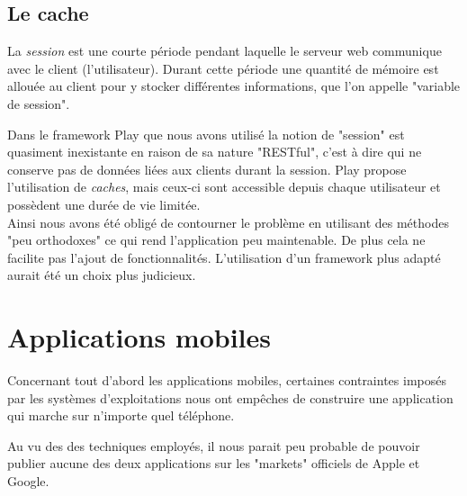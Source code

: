 \subsection{Le cache}

La \textit{session} est une courte période pendant laquelle le serveur web communique avec le client (l'utilisateur).
Durant cette période une quantité de mémoire est allouée au client pour y stocker différentes informations, que l'on appelle "variable de session".

Dans le framework Play que nous avons utilisé la notion de "session" est quasiment inexistante en raison de sa nature "RESTful", c'est à dire qui ne conserve pas de données liées aux clients durant la session.
Play propose l'utilisation de \textit{caches}, mais ceux-ci sont accessible depuis chaque utilisateur et possèdent une durée de vie limitée.
\\


Ainsi nous avons été obligé de contourner le problème en utilisant des méthodes "peu orthodoxes" ce qui rend l'application peu maintenable.
De plus cela ne facilite pas l'ajout de fonctionnalités.
L'utilisation d'un framework plus adapté aurait été un choix plus judicieux.






\section{Applications mobiles}

Concernant tout d'abord les applications mobiles, certaines contraintes imposés par les systèmes d'exploitations nous ont empêches de construire une application qui marche sur n'importe quel téléphone.

Au vu des des techniques employés, il nous parait peu probable de pouvoir publier aucune des
deux applications sur les "markets" officiels de Apple et Google.




